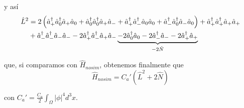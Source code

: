y así
\begin{equation}
\begin{split}
\hat{L}^2 &= 2\left( \interactt{+}{0}{+}{0} + \interactt{0}{0}{+}{-} +\interactt{+}{-}{0}{0} + \interactt{-}{0}{-}{0}\right) + \interactt{+}{+}{+}{+} \\
& + \interactt{-}{-}{-}{-} -2 \interactt{+}{-}{+}{-}  \underbrace{- 2\crea{0}\anni{0} -2\crea{-}\anni{-}  -2\crea{+}\anni{+}}_{-2\hat{N}} 
\end{split}
\end{equation}
\label{lsqrd}

que, si comparamos con $\hat{H}_{nosim}$, obtenemos finalmente que 
\begin{equation}
\hat{H}_{nosim} = C_a'\left( \hat{L}^2 + 2\hat{N} \right)
\label{h_nosim_integ}
\end{equation}

con $C_a' = \frac{C_a}{2}\int_{\Omega}|\phi|^4d^3x$.








